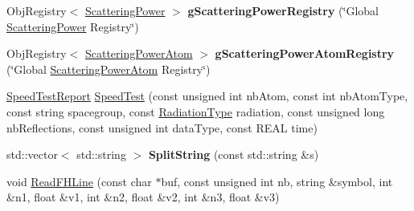 \begin{DoxyCompactItemize}
Obj\+Registry$<$ \mbox{\hyperlink{class_obj_cryst_1_1_scattering_power}{Scattering\+Power}} $>$ {\bfseries g\+Scattering\+Power\+Registry} (\char`\"{}Global \mbox{\hyperlink{class_obj_cryst_1_1_scattering_power}{Scattering\+Power}} Registry\char`\"{})
\item 
\mbox{\label{namespace_obj_cryst_a8e9a8f0fa516fa1ce7c7ef9928925c26}} 
Obj\+Registry$<$ \mbox{\hyperlink{class_obj_cryst_1_1_scattering_power_atom}{Scattering\+Power\+Atom}} $>$ {\bfseries g\+Scattering\+Power\+Atom\+Registry} (\char`\"{}Global \mbox{\hyperlink{class_obj_cryst_1_1_scattering_power_atom}{Scattering\+Power\+Atom}} Registry\char`\"{})
\item 
\mbox{\hyperlink{struct_obj_cryst_1_1_speed_test_report}{Speed\+Test\+Report}} \mbox{\hyperlink{namespace_obj_cryst_a775b62d07c596365d2f2d021dca408db}{Speed\+Test}} (const unsigned int nb\+Atom, const int nb\+Atom\+Type, const string spacegroup, const \mbox{\hyperlink{namespace_obj_cryst_a48fe50a094c607f8897378934d3d73ef}{Radiation\+Type}} radiation, const unsigned long nb\+Reflections, const unsigned int data\+Type, const R\+E\+AL time)
\item 
\mbox{\label{namespace_obj_cryst_a17ccaf627c4063bfbcab198b3d14b10b}} 
std\+::vector$<$ std\+::string $>$ {\bfseries Split\+String} (const std\+::string \&s)
\item 
void \mbox{\hyperlink{namespace_obj_cryst_a36ff196370e39131e82f33eb55306c6d}{Read\+F\+H\+Line}} (const char $\ast$buf, const unsigned int nb, string \&symbol, int \&n1, float \&v1, int \&n2, float \&v2, int \&n3, float \&v3)
\end{DoxyCompactItemize}

